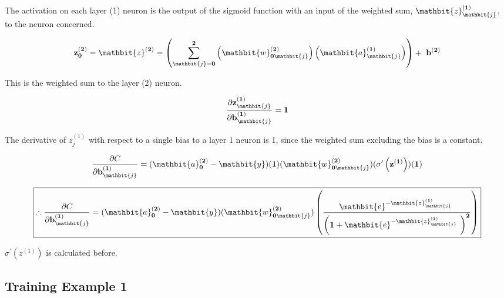 \documentclass[12pt,a4paper]{article}
\begin{document}
The activation on each layer (1) neuron is the output of the sigmoid function with an input of the weighted sum, $\mathbit{z}_\mathbit{j}^{\left(\mathbf{1}\right)}$, to the neuron concerned.


\begin{equation}
\mathbf{z}_\mathbf{0}^{\left(\mathbf{2}\right)}=\mathbit{z}^{\left(\mathbf{2}\right)}=\left(\sum_{\mathbit{j}=\mathbf{0}}^{\mathbf{2}}\left(\mathbit{w}_{\mathbf{0}\mathbit{j}}^{\left(\mathbf{2}\right)}\right)\left(\mathbit{a}_\mathbit{j}^{\left(\mathbf{1}\right)}\right)\right)+\ \mathbf{b}^{\left(\mathbf{2}\right)}	
\end{equation}

This is the weighted sum to the layer (2) neuron.


\begin{equation}
\frac{\partial\mathbf{z}_\mathbit{j}^{\left(\mathbf{1}\right)}}{\partial\mathbf{b}_\mathbit{j}^{\left(\mathbf{1}\right)}}=\mathbf{1}
\end{equation}


The derivative of $z_j^{\left(1\right)}$ with respect to a single bias to a layer 1 neuron is 1, since the weighted sum excluding the bias is a constant.


\begin{equation}
\frac{\partial C}{\partial\mathbf{b}_\mathbit{j}^{\left(\mathbf{1}\right)}}={(\mathbit{a}}_\mathbf{0}^{\left(\mathbf{2}\right)}-\mathbit{y})(\mathbf{1})(\mathbit{w}_{\mathbf{0}\mathbit{j}}^{\left(\mathbf{2}\right)})(\mathbf{\sigma}^\prime\left(\mathbf{z}^{\left(\mathbf{1}\right)}\right))(\mathbf{1})	
\end{equation}


\begin{equation}
\boxed{\therefore\frac{\partial C}{\partial\mathbf{b}_\mathbit{j}^{\left(\mathbf{1}\right)}}={(\mathbit{a}}_\mathbf{0}^{\left(\mathbf{2}\right)}-\mathbit{y})(\mathbit{w}_{\mathbf{0}\mathbit{j}}^{\left(\mathbf{2}\right)})\left(\frac{\mathbit{e}^{-\mathbit{z}_\mathbit{j}^{\left(\mathbf{1}\right)}\ }}{\left(\mathbf{1}+\mathbit{e}^{-\mathbit{z}_\mathbit{j}^{\left(\mathbf{1}\right)}\ }\right)^\mathbf{2}}\right)}
\end{equation}


$\sigma^\prime\left(z^{\left(1\right)}\right)$ is calculated before. 







\subsection{Training Example 1}
\end{document}
